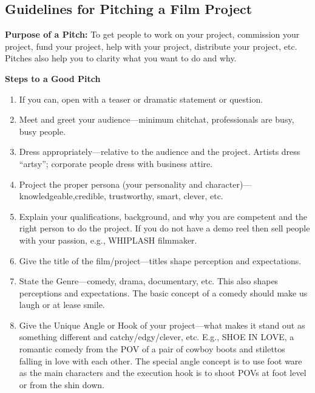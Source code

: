 \documentclass[
]{book}
\providecommand{\tightlist}{%
  \setlength{\itemsep}{0pt}\setlength{\parskip}{0pt}}
\begin{document}
\begin{reflect}
\hypertarget{guidelines-for-pitching-a-film-project}{%
\subsection*{Guidelines for Pitching a Film Project}\label{guidelines-for-pitching-a-film-project}}

\textbf{Purpose of a Pitch:} To get people to work on your project, commission your
project, fund your project, help with your project, distribute your project,
etc. Pitches also help you to clarity what you want to do and why.

\textbf{Steps to a Good Pitch}

\begin{enumerate}
\def\labelenumi{\arabic{enumi}.}
\tightlist
\item
  If you can, open with a teaser or dramatic statement or question.\\
\item
  Meet and greet your audience---minimum chitchat, professionals are busy, busy people.\\
\item
  Dress appropriately---relative to the audience and the project. Artists dress ``artsy''; corporate people dress with business attire.\\
\item
  Project the proper persona (your personality and character)---knowledgeable,credible, trustworthy, smart, clever, etc.\\
\item
  Explain your qualifications, background, and why you are competent and the right person to do the project. If you do not have a demo reel then sell people with your passion, e.g., WHIPLASH filmmaker.\\
\item
  Give the title of the film/project---titles shape perception and expectations.\\
\item
  State the Genre---comedy, drama, documentary, etc. This also shapes perceptions and expectations. The basic concept of a comedy should make us laugh or at lease smile.\\
\item
  Give the Unique Angle or Hook of your project---what makes it stand out as something different and catchy/edgy/clever, etc. E.g., SHOE IN LOVE, a romantic comedy from the POV of a pair of cowboy boots and stilettos falling in love with each other. The special angle concept is to use foot ware as the main characters and the execution hook is to shoot POVs at foot level or from the shin down.\\

\end{enumerate}
\end{reflect}
\end{document}
